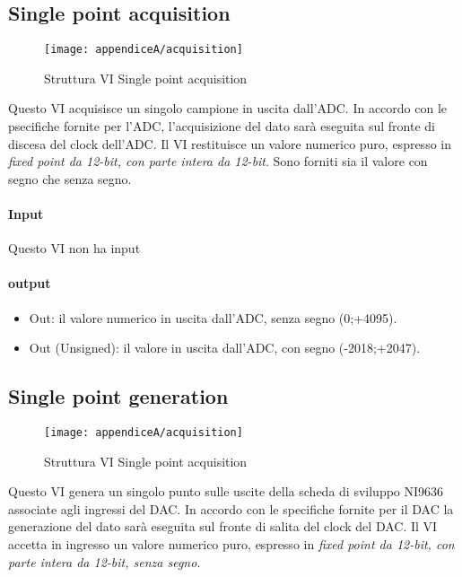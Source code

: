 \subsection{Single point acquisition}

\begin{figure}[H]  
	\begin{center}
		\texttt{[image: appendiceA/acquisition]}
		\caption{Struttura VI Single point acquisition}
	\end{center}
\end{figure}

Questo VI acquisisce un singolo campione in uscita dall'ADC. In accordo con le psecifiche fornite per l'ADC, l'acquisizione del dato sarà eseguita sul fronte di discesa del clock dell'ADC.
Il VI restituisce un valore numerico puro, espresso in \textit{fixed point da 12-bit, con parte intera da 12-bit}. Sono forniti sia il valore con segno che senza segno.

\paragraph{Input}
Questo VI non ha input

\paragraph{output}
\begin{itemize}
	\item Out: il valore numerico in uscita dall'ADC, senza segno (0;+4095).
	\item Out (Unsigned): il valore in uscita dall'ADC, con segno (-2018;+2047).
\end{itemize}

\subsection{Single point generation}

\begin{figure}[H]  
	\begin{center}
		\texttt{[image: appendiceA/acquisition]}
		\caption{Struttura VI Single point acquisition}
	\end{center}
\end{figure}

Questo VI genera un singolo punto sulle uscite della scheda di sviluppo NI9636 associate agli ingressi del DAC. In accordo con le specifiche fornite per il DAC la generazione del dato sarà eseguita sul fronte di salita del clock del DAC. Il VI accetta in ingresso un valore numerico puro, espresso in \textit{fixed point da 12-bit, con parte intera da 12-bit, senza segno}.
